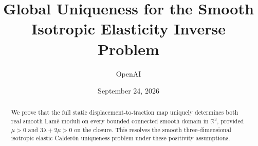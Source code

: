\documentclass[11pt]{article}
\title{Global Uniqueness for the Smooth Isotropic Elasticity Inverse Problem}
\author{OpenAI}
\date{September 24, 2026}
\newcommand{\R}{\mathbb R}
\theoremstyle{remark}
\numberwithin{equation}{section}
\begin{document}
\maketitle
\begin{abstract}
We prove that the full static displacement-to-traction map uniquely determines both real smooth Lam\'e moduli on every bounded connected smooth domain in $\R^3$, provided $\mu>0$ and $3\lambda+2\mu>0$ on the closure. This resolves the smooth three-dimensional isotropic elastic Calder\'on uniqueness problem under these positivity assumptions.
\end{abstract}

\tableofcontents
\medskip







\begingroup
\small


\endgroup
\end{document}
